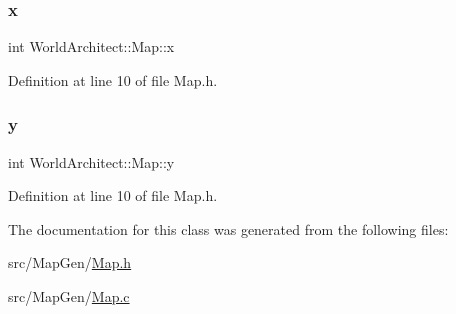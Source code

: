 \subsubsection{\texorpdfstring{x}{x}}
{\footnotesize\ttfamily int World\+Architect\+::\+Map\+::x\hspace{0.3cm}{\ttfamily [protected]}}



Definition at line 10 of file Map.\+h.

\mbox{\label{class_world_architect_1_1_map_abd1e160bb8b03587caac4fb508c13307}} 
\subsubsection{\texorpdfstring{y}{y}}
{\footnotesize\ttfamily int World\+Architect\+::\+Map\+::y\hspace{0.3cm}{\ttfamily [protected]}}



Definition at line 10 of file Map.\+h.



The documentation for this class was generated from the following files\+:\begin{DoxyCompactItemize}
\item 
src/\+Map\+Gen/\mbox{\hyperlink{_map_8h}{Map.\+h}}\item 
src/\+Map\+Gen/\mbox{\hyperlink{_map_8c}{Map.\+c}}\end{DoxyCompactItemize}
